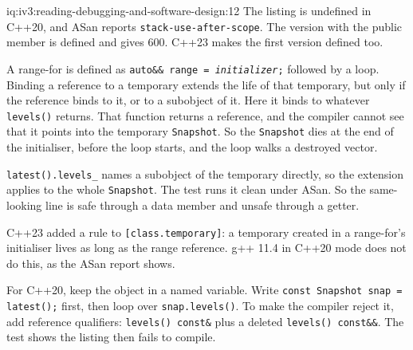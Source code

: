 \begin{solution}{iq:iv3:reading-debugging-and-software-design:12}
The listing is undefined in C++20, and ASan reports \texttt{stack-use-after-scope}. The version with the public member is defined and gives 600. C++23 makes the first version defined too.

A range-for is defined as \texttt{auto\&\& range = \textit{initializer};} followed by a loop. Binding a reference to a temporary extends the life of that temporary, but only if the reference binds to it, or to a subobject of it. Here it binds to whatever \texttt{levels()} returns. That function returns a reference, and the compiler cannot see that it points into the temporary \texttt{Snapshot}. So the \texttt{Snapshot} dies at the end of the initialiser, before the loop starts, and the loop walks a destroyed vector.

\texttt{latest().levels\_} names a subobject of the temporary directly, so the extension applies to the whole \texttt{Snapshot}. The test runs it clean under ASan. So the same-looking line is safe through a data member and unsafe through a getter.

C++23 added a rule to \texttt{[class.temporary]}: a temporary created in a range-for's initialiser lives as long as the range reference. g++ 11.4 in C++20 mode does not do this, as the ASan report shows.

For C++20, keep the object in a named variable. Write \texttt{const Snapshot snap = latest();} first, then loop over \texttt{snap.levels()}. To make the compiler reject it, add reference qualifiers: \texttt{levels() const\&} plus a deleted \texttt{levels() const\&\&}. The test shows the listing then fails to compile.


\end{solution}

